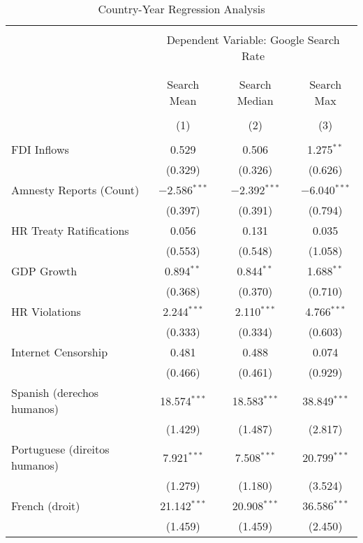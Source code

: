 
\begin{table}[!htbp] \centering 
  \caption{Country-Year Regression Analysis} 
  \label{} 
\begin{tabular}{@{\extracolsep{5pt}}lccc} 
\\[-1.8ex]\hline 
\hline \\[-1.8ex] 
 & \multicolumn{3}{c}{Dependent Variable: Google Search Rate} \\ 
\cline{2-4} 
\\[-1.8ex] & \multicolumn{3}{c}{ } \\ 
 & Search Mean & Search Median & Search Max \\ 
\\[-1.8ex] & (1) & (2) & (3)\\ 
\hline \\[-1.8ex] 
 FDI Inflows & 0.529 & 0.506 & 1.275$^{**}$ \\ 
  & (0.329) & (0.326) & (0.626) \\ 
  Amnesty Reports (Count) & $-$2.586$^{***}$ & $-$2.392$^{***}$ & $-$6.040$^{***}$ \\ 
  & (0.397) & (0.391) & (0.794) \\ 
  HR Treaty Ratifications & 0.056 & 0.131 & 0.035 \\ 
  & (0.553) & (0.548) & (1.058) \\ 
  GDP Growth & 0.894$^{**}$ & 0.844$^{**}$ & 1.688$^{**}$ \\ 
  & (0.368) & (0.370) & (0.710) \\ 
  HR Violations & 2.244$^{***}$ & 2.110$^{***}$ & 4.766$^{***}$ \\ 
  & (0.333) & (0.334) & (0.603) \\ 
  Internet Censorship & 0.481 & 0.488 & 0.074 \\ 
  & (0.466) & (0.461) & (0.929) \\ 
  Spanish (derechos humanos) & 18.574$^{***}$ & 18.583$^{***}$ & 38.849$^{***}$ \\ 
  & (1.429) & (1.487) & (2.817) \\ 
  Portuguese (direitos humanos) & 7.921$^{***}$ & 7.508$^{***}$ & 20.799$^{***}$ \\ 
  & (1.279) & (1.180) & (3.524) \\ 
  French (droit) & 21.142$^{***}$ & 20.908$^{***}$ & 36.586$^{***}$ \\ 
  & (1.459) & (1.459) & (2.450) \\ 

\end{tabular}
\end{table}
